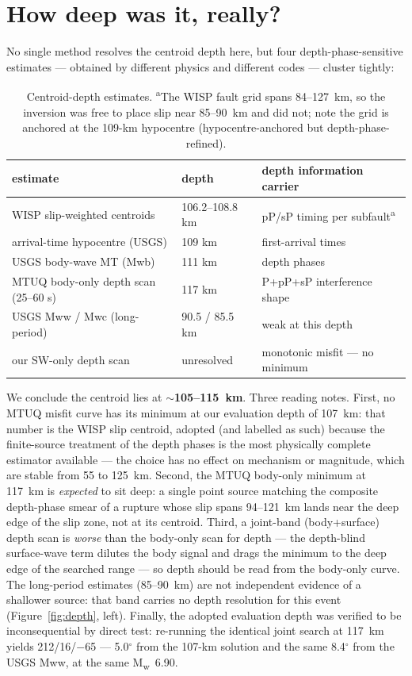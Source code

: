 \documentclass[11pt]{article}
\newcommand{\Mw}{M\textsubscript{w}}
\begin{document}
\section{How deep was it, really?}
No single method resolves the centroid depth here, but four depth-phase-sensitive estimates
--- obtained by different physics and different codes --- cluster tightly:

\begin{table}[H]\centering\small
\begin{tabular}{lll}\toprule
estimate & depth & depth information carrier\\\midrule
WISP slip-weighted centroids & 106.2--108.8 km & pP/sP timing per subfault\textsuperscript{a}\\
arrival-time hypocentre (USGS) & 109 km & first-arrival times\\
USGS body-wave MT (Mwb) & 111 km & depth phases\\
MTUQ body-only depth scan (25--60 s) & 117 km & P+pP+sP interference shape\\\midrule
USGS Mww / Mwc (long-period) & 90.5 / 85.5 km & weak at this depth\\
our SW-only depth scan & unresolved & monotonic misfit --- no minimum\\\bottomrule
\end{tabular}
\caption{Centroid-depth estimates. \textsuperscript{a}The WISP fault grid spans 84--127~km, so
the inversion was free to place slip near 85--90~km and did not; note the grid is anchored at
the 109-km hypocentre (hypocentre-anchored but depth-phase-refined).}
\label{tab:depth}
\end{table}

We conclude the centroid lies at \textbf{$\sim$105--115~km}. Three reading notes. First, no
MTUQ misfit curve has its minimum at our evaluation depth of 107~km: that number is the WISP
slip centroid, adopted (and labelled as such) because the finite-source treatment of the depth
phases is the most physically complete estimator available --- the choice has no effect on
mechanism or magnitude, which are stable from 55 to 125~km. Second, the MTUQ body-only minimum
at 117~km is \emph{expected} to sit deep: a single point source matching the composite
depth-phase smear of a rupture whose slip spans 94--121~km lands near the deep edge of the
slip zone, not at its centroid. Third, a joint-band (body+surface) depth scan is \emph{worse}
than the body-only scan for depth --- the depth-blind surface-wave term dilutes the body
signal and drags the minimum to the deep edge of the searched range --- so depth should be
read from the body-only curve. The long-period estimates (85--90~km) are not independent
evidence of a shallower source: that band carries no depth resolution for this event
(Figure~\ref{fig:depth}, left). Finally, the adopted evaluation depth was verified to be
inconsequential by direct test: re-running the identical joint search at 117~km yields
212/16/$-$65 --- 5.0$^\circ$ from the 107-km solution and the same 8.4$^\circ$ from the USGS
Mww, at the same \Mw~6.90.
\end{document}
